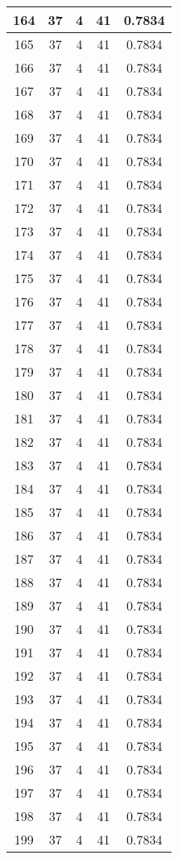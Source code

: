\documentclass[letterpaper, 12pt]{article}
\begin{document}
\begin{longtable}{|c|c|c|c|c|}
\hline
164 & 37 & 4 & 41 & 0.7834 \\
\hline
165 & 37 & 4 & 41 & 0.7834 \\
\hline
166 & 37 & 4 & 41 & 0.7834 \\
\hline
167 & 37 & 4 & 41 & 0.7834 \\
\hline
168 & 37 & 4 & 41 & 0.7834 \\
\hline
169 & 37 & 4 & 41 & 0.7834 \\
\hline
170 & 37 & 4 & 41 & 0.7834 \\
\hline
171 & 37 & 4 & 41 & 0.7834 \\
\hline
172 & 37 & 4 & 41 & 0.7834 \\
\hline
173 & 37 & 4 & 41 & 0.7834 \\
\hline
174 & 37 & 4 & 41 & 0.7834 \\
\hline
175 & 37 & 4 & 41 & 0.7834 \\
\hline
176 & 37 & 4 & 41 & 0.7834 \\
\hline
177 & 37 & 4 & 41 & 0.7834 \\
\hline
178 & 37 & 4 & 41 & 0.7834 \\
\hline
179 & 37 & 4 & 41 & 0.7834 \\
\hline
180 & 37 & 4 & 41 & 0.7834 \\
\hline
181 & 37 & 4 & 41 & 0.7834 \\
\hline
182 & 37 & 4 & 41 & 0.7834 \\
\hline
183 & 37 & 4 & 41 & 0.7834 \\
\hline
184 & 37 & 4 & 41 & 0.7834 \\
\hline
185 & 37 & 4 & 41 & 0.7834 \\
\hline
186 & 37 & 4 & 41 & 0.7834 \\
\hline
187 & 37 & 4 & 41 & 0.7834 \\
\hline
188 & 37 & 4 & 41 & 0.7834 \\
\hline
189 & 37 & 4 & 41 & 0.7834 \\
\hline
190 & 37 & 4 & 41 & 0.7834 \\
\hline
191 & 37 & 4 & 41 & 0.7834 \\
\hline
192 & 37 & 4 & 41 & 0.7834 \\
\hline
193 & 37 & 4 & 41 & 0.7834 \\
\hline
194 & 37 & 4 & 41 & 0.7834 \\
\hline
195 & 37 & 4 & 41 & 0.7834 \\
\hline
196 & 37 & 4 & 41 & 0.7834 \\
\hline
197 & 37 & 4 & 41 & 0.7834 \\
\hline
198 & 37 & 4 & 41 & 0.7834 \\
\hline
199 & 37 & 4 & 41 & 0.7834 \\
\hline
\end{longtable}
\end{document}
